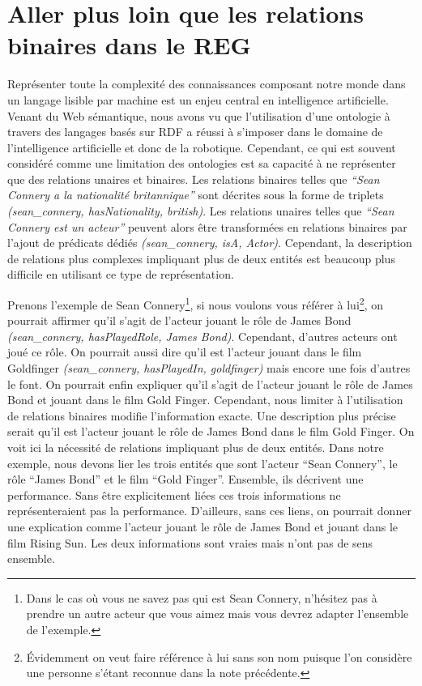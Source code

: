 \section*{Aller plus loin que les relations binaires dans le REG}

Représenter toute la complexité des connaissances composant notre monde dans un langage lisible par machine est un enjeu central en intelligence artificielle. Venant du Web sémantique, nous avons vu que l'utilisation d'une ontologie à travers des langages basés sur RDF a réussi à s'imposer dans le domaine de l'intelligence artificielle et donc de la robotique. Cependant, ce qui est souvent considéré comme une limitation des ontologies est sa capacité à ne représenter que des relations unaires et binaires. Les relations binaires telles que \textit{``Sean Connery a la nationalité britannique''} sont décrites sous la forme de triplets \textit{(sean\_connery, hasNationality, british)}. Les relations unaires telles que \textit{``Sean Connery est un acteur''} peuvent alors être transformées en relations binaires par l'ajout de prédicats dédiés \textit{(sean\_connery, isA, Actor)}. Cependant, la description de relations plus complexes impliquant plus de deux entités est beaucoup plus difficile en utilisant ce type de représentation.

Prenons l'exemple de Sean Connery\footnote{Dans le cas où vous ne savez pas qui est Sean Connery, n'hésitez pas à prendre un autre acteur que vous aimez mais vous devrez adapter l'ensemble de l'exemple.}, si nous voulons vous référer à lui\footnote {Évidemment on veut faire référence à lui sans son nom puisque l'on considère une personne s'étant reconnue dans la note précédente.}, on pourrait affirmer qu'il s'agit de l'acteur jouant le rôle de James Bond \textit{(sean\_connery, hasPlayedRole, James Bond)}. Cependant, d'autres acteurs ont joué ce rôle. On pourrait aussi dire qu'il est l'acteur jouant dans le film Goldfinger \textit{(sean\_connery, hasPlayedIn, goldfinger)} mais encore une fois d'autres le font. On pourrait enfin expliquer qu'il s'agit de l'acteur jouant le rôle de James Bond et jouant dans le film Gold Finger. Cependant, nous limiter à l'utilisation de relations binaires modifie l'information exacte. Une description plus précise serait qu'il est l'acteur jouant le rôle de James Bond dans le film Gold Finger. On voit ici la nécessité de relations impliquant plus de deux entités. Dans notre exemple, nous devons lier les trois entités que sont l'acteur ``Sean Connery'', le rôle ``James Bond'' et le film ``Gold Finger''. Ensemble, ils décrivent une performance. Sans être explicitement liées ces trois informations ne représenteraient pas la performance. D'ailleurs, sans ces liens, on pourrait donner une explication comme l'acteur jouant le rôle de James Bond et jouant dans le film Rising Sun. Les deux informations sont vraies mais n'ont pas de sens ensemble.

